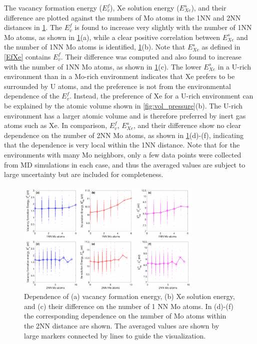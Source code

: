 \documentclass[review]{elsarticle}
\begin{document}
The vacancy formation energy ($E^f_v$), Xe solution energy ($E^s_{Xe}$), and their difference are plotted against the numbers of Mo atoms in the 1NN and 2NN distances in \cref{fig:MoNN}. The $E^f_v$ is found to increase very slightly with the number of 1NN Mo atoms, as shown in \cref{fig:MoNN}(a), while a clear positive correlation between $E^s_{Xe}$ and the number of 1NN Mo atoms is identified, \cref{fig:MoNN}(b). Note that $E^s_{Xe}$ as defined in \cref{EfXe} contains $E^f_{v}$. Their difference was computed and also found to increase with the number of 1NN Mo atoms, as shown in \cref{fig:MoNN}(c). The lower $E^s_{Xe}$ in a U-rich environment than in a Mo-rich environment indicates that Xe prefers to be surrounded by U atoms, and the preference is not from the environmental dependence of the $E^f_{v}$. Instead, the preference of Xe for a U-rich environment can be explained by the atomic volume shown in \cref{fig:vol_pressure}(b). The U-rich environment has a larger atomic volume and is therefore preferred by inert gas atoms such as Xe. In comparison, $E^f_{v}$, $E^s_{Xe}$, and their difference show no clear dependence on the number of 2NN Mo atoms, as shown in \cref{fig:MoNN}(d)-(f), indicating that the dependence is very local within the 1NN distance. Note that for the environments with many Mo neighbors, only a few data points were collected from MD simulations in each case, and thus the averaged values are subject to large uncertainty but are included for completeness.

\begin{figure}[h!]
 \centering
 \includegraphics[width=0.8\textwidth]{MoNN} 
 \caption{Dependence of (a) vacancy formation energy, (b) Xe solution energy, and (c) their difference on the number of 1 NN Mo atoms. In (d)-(f) the corresponding dependence on the number of Mo atoms within the 2NN distance are shown. The averaged values are shown by large markers connected by lines to guide the visualization. }
 \label{fig:MoNN}
\end{figure}
\end{document}
